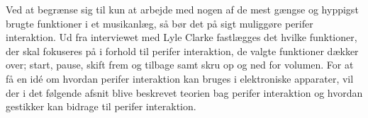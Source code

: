 Ved at begrænse sig til kun at arbejde med nogen af de mest gængse og hyppigst brugte funktioner i et musikanlæg, så bør det på sigt muliggøre perifer interaktion. Ud fra interviewet med Lyle Clarke fastlægges det hvilke funktioner, der skal fokuseres på i forhold til perifer interaktion, de valgte funktioner dækker over; start, pause, skift frem og tilbage samt skru op og ned for volumen.\blankline
%
For at få en idé om hvordan perifer interaktion kan bruges i elektroniske apparater, vil der i det følgende afsnit blive beskrevet teorien bag perifer interaktion og hvordan gestikker kan bidrage til perifer interaktion. 

